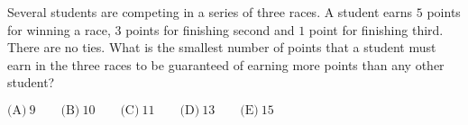 

Several students are competing in a series of three races. A student earns $5$ points for winning a race, $3$ points for finishing second and $1$ point for finishing third. There are no ties. What is the smallest number of points that a student must earn in the three races to be guaranteed of earning more points than any other student?

$\text{(A)}\ 9 \qquad \text{(B)}\ 10 \qquad \text{(C)}\ 11 \qquad \text{(D)}\ 13 \qquad \text{(E)}\ 15$
